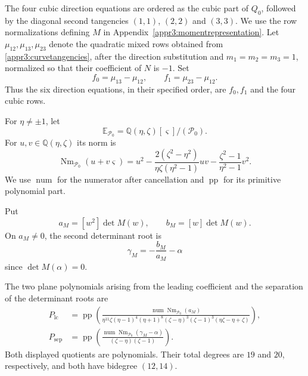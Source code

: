 \documentclass[11pt,a4paper]{article}
\numberwithin{equation}{section}
\theoremstyle{plain}
\theoremstyle{definition}
\theoremstyle{remark}
\begin{document}
The four cubic direction equations are ordered as the cubic part of
$Q_0$, followed by the diagonal second tangencies $(1,1)$, $(2,2)$
and $(3,3)$. We use the row normalizations defining $M$ in
Appendix~\ref{appr3:momentrepresentation}.
Let $\mu_{12},\mu_{13},\mu_{23}$ denote the quadratic mixed rows
obtained from \eqref{appr3:curvetangencies}, after the direction
substitution and $m_1=m_2=m_3=1$, normalized so that their coefficient
of $N$ is $-1$. Set
\[
 f_0=\mu_{13}-\mu_{12},\qquad
 f_1=\mu_{23}-\mu_{12}.
\]
Thus the six direction equations, in their specified order, are
$f_0,f_1$ and the four cubic rows.

For $\eta\ne\pm1$, let
\[
 \mathbb E_{\mathcal P_0}=\mathbb Q(\eta,\zeta)[\varsigma]/(\mathcal P_0).
\]
For $u,v\in\mathbb Q(\eta,\zeta)$ its norm is
\[
 \operatorname{Nm}_{\mathcal P_0}(u+v\varsigma)
 =u^2-\frac{2(\zeta^2-\eta^2)}{\eta\zeta(\eta^2-1)}uv
       -\frac{\zeta^2-1}{\eta^2-1}v^2.
\]
We use $\operatorname{num}$ for the numerator after cancellation
and $\operatorname{pp}$ for its primitive polynomial part.

Put
\[
 a_M=[w^2]\det M(w),\qquad b_M=[w]\det M(w).
\]
On $a_M\ne0$, the second determinant root is
\[
 \gamma_M=-\frac{b_M}{a_M}-\alpha
\]
since $\det M(\alpha)=0$.

The two plane polynomials arising from the leading coefficient and
the separation of the determinant roots are
\[
\begin{aligned}
 P_{\mathrm{lc}}&=\operatorname{pp}\left(
 \frac{\operatorname{num}\operatorname{Nm}_{\mathcal P_0}(a_M)}
 {\eta^{11}\zeta(\eta-1)^4(\eta+1)^8
  (\zeta-\eta)^3(\zeta-1)^3
  (\eta\zeta-\eta+\zeta)}\right),\\
 P_{\mathrm{sep}}&=\operatorname{pp}\left(
 \frac{\operatorname{num}\operatorname{Nm}_{\mathcal P_0}(\gamma_M-\alpha)}
 {(\zeta-\eta)(\zeta-1)}\right).
\end{aligned}
\]
Both displayed quotients are polynomials. Their total degrees are
$19$ and $20$, respectively, and both have bidegree $(12,14)$.
\end{document}
